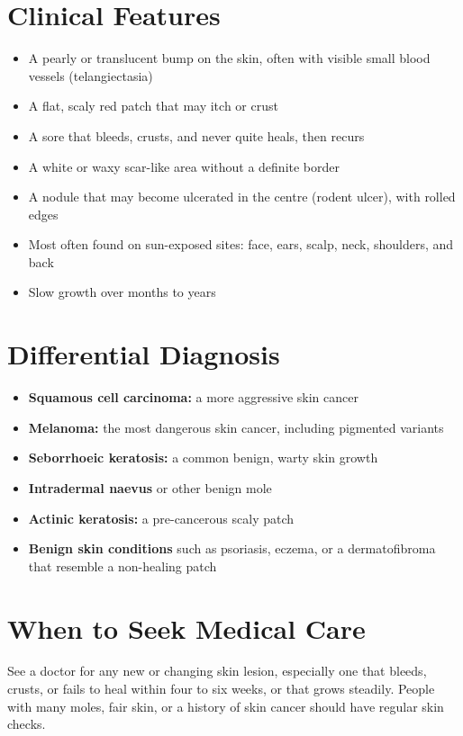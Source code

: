 \section*{Clinical Features}
\begin{itemize}
    \item A pearly or translucent bump on the skin, often with visible small blood vessels (telangiectasia)
    \item A flat, scaly red patch that may itch or crust
    \item A sore that bleeds, crusts, and never quite heals, then recurs
    \item A white or waxy scar-like area without a definite border
    \item A nodule that may become ulcerated in the centre (rodent ulcer), with rolled edges
    \item Most often found on sun-exposed sites: face, ears, scalp, neck, shoulders, and back
    \item Slow growth over months to years
\end{itemize}

\section*{Differential Diagnosis}
\begin{itemize}
    \item \textbf{Squamous cell carcinoma:} a more aggressive skin cancer
    \item \textbf{Melanoma:} the most dangerous skin cancer, including pigmented variants
    \item \textbf{Seborrhoeic keratosis:} a common benign, warty skin growth
    \item \textbf{Intradermal naevus} or other benign mole
    \item \textbf{Actinic keratosis:} a pre-cancerous scaly patch
    \item \textbf{Benign skin conditions} such as psoriasis, eczema, or a dermatofibroma that resemble a non-healing patch
\end{itemize}

\section*{When to Seek Medical Care}
See a doctor for any new or changing skin lesion, especially one that bleeds, crusts, or fails to heal within four to six weeks, or that grows steadily. People with many moles, fair skin, or a history of skin cancer should have regular skin checks.

